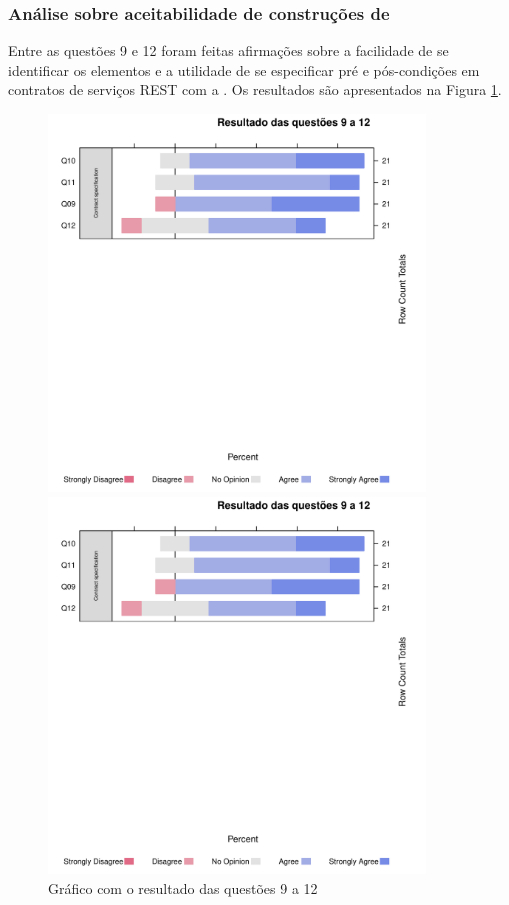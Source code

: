 \subsubsection{Análise sobre aceitabilidade de construções de \designbycontract{}}

Entre as questões 9 e 12 foram feitas afirmações sobre a facilidade de se
identificar os elementos e a utilidade de se especificar pré e pós-condições em
contratos de serviços REST com a \neoidl{}. Os resultados são apresentados na
Figura \ref{Respostas9a12}. 

\begin{figure}[!htb]
\centering
\includegraphics[width=100mm,trim = 6mm 115mm 6mm 
10mm,clip]{img/GraficoResultadoQuestoes9a12.pdf}

\includegraphics[width=100mm,trim = 6mm 0mm 6mm 
170mm,clip]{img/GraficoResultadoQuestoes9a12.pdf}

\caption{Gráfico com o resultado das questões 9 a 12}
\label{Respostas9a12}
\end{figure}

